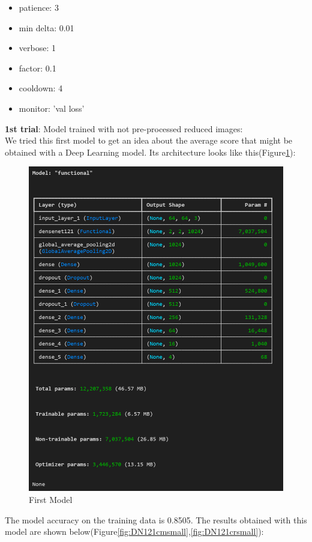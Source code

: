 \documentclass{article}
\begin{document}
\begin{itemize}
    \item patience: 3
    \item min delta: 0.01
    \item verbose: 1
    \item factor: 0.1
    \item cooldown: 4
    \item  monitor: 'val loss'
\end{itemize} 

\textbf{1st trial}: Model trained with not pre-processed reduced images:\\
We tried this first model to get an idea about the  average score that might be obtained with a Deep Learning model. Its architecture looks like this(Figure\ref{fig:DN121archsmall}):

 \begin{figure}[H]
    \centering
    \includegraphics[width=0.5\linewidth]{DN121archsmall.png}
    \caption{First Model}
    \label{fig:DN121archsmall}
\end{figure}

The model accuracy on the training data is 0.8505. The results obtained with this model are shown below(Figure\ref{fig:DN121cmsmall},\ref{fig:DN121crsmall}):
\end{document}
